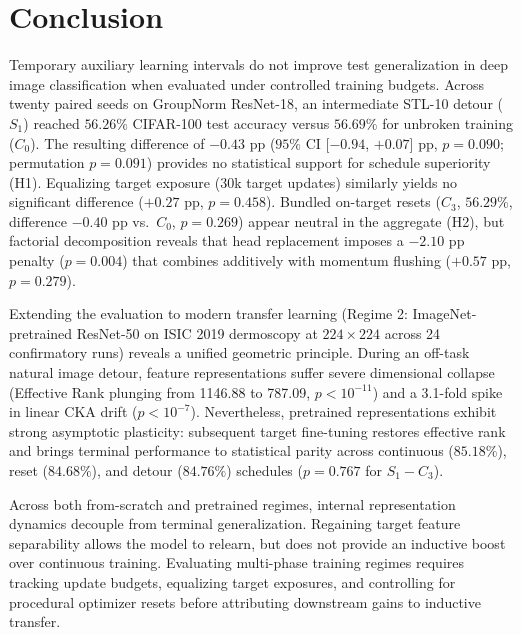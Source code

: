 \documentclass[sn-mathphys,Numbered]{sn-jnl}
\begin{document}
\section{Conclusion}\label{sec:conclusion}

Temporary auxiliary learning intervals do not improve test generalization in deep image classification when evaluated under controlled training budgets. Across twenty paired seeds on GroupNorm ResNet-18, an intermediate STL-10 detour ($S_1$) reached $56.26\%$ CIFAR-100 test accuracy versus $56.69\%$ for unbroken training ($C_0$). The resulting difference of $-0.43$ pp ($95\%$ CI [$-0.94$, $+0.07$] pp, $p = 0.090$; permutation $p = 0.091$) provides no statistical support for schedule superiority (H1). Equalizing target exposure (30k target updates) similarly yields no significant difference ($+0.27$ pp, $p = 0.458$). Bundled on-target resets ($C_3$, $56.29\%$, difference $-0.40$ pp vs.\ $C_0$, $p = 0.269$) appear neutral in the aggregate (H2), but factorial decomposition reveals that head replacement imposes a $-2.10$ pp penalty ($p = 0.004$) that combines additively with momentum flushing ($+0.57$ pp, $p = 0.279$).

Extending the evaluation to modern transfer learning (Regime 2: ImageNet-pretrained ResNet-50 on ISIC 2019 dermoscopy at $224 \times 224$ across 24 confirmatory runs) reveals a unified geometric principle. During an off-task natural image detour, feature representations suffer severe dimensional collapse (Effective Rank plunging from 1146.88 to 787.09, $p < 10^{-11}$) and a 3.1-fold spike in linear CKA drift ($p < 10^{-7}$). Nevertheless, pretrained representations exhibit strong asymptotic plasticity: subsequent target fine-tuning restores effective rank and brings terminal performance to statistical parity across continuous ($85.18\%$), reset ($84.68\%$), and detour ($84.76\%$) schedules ($p = 0.767$ for $S_1 - C_3$).

Across both from-scratch and pretrained regimes, internal representation dynamics decouple from terminal generalization. Regaining target feature separability allows the model to relearn, but does not provide an inductive boost over continuous training. Evaluating multi-phase training regimes requires tracking update budgets, equalizing target exposures, and controlling for procedural optimizer resets before attributing downstream gains to inductive transfer.
\end{document}
